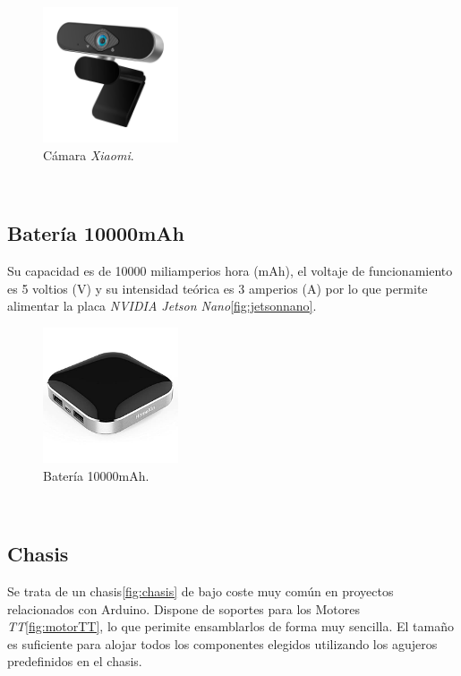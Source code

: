\begin{figure} [h!]
	\begin{center}
		\includegraphics[width=4cm]{figs/camera}
	\end{center}
	\caption{Cámara \textit{Xiaomi}.}
	\label{fig:xiaomicamera}
\end{figure}\

\subsection{Batería 10000mAh}
Su capacidad es de 10000 miliamperios hora (mAh), el voltaje de funcionamiento es 5 voltios (V) y su intensidad teórica es 3 amperios (A) por lo que permite alimentar la placa \textit{NVIDIA Jetson Nano}\ref{fig:jetsonnano}.\\

\begin{figure} [h!]
	\begin{center}
		\includegraphics[width=4cm]{figs/battery}
	\end{center}
	\caption{Batería 10000mAh.}
	\label{fig:battery}
\end{figure}\

\subsection{Chasis}
Se trata de un chasis\ref{fig:chasis} de bajo coste muy común en proyectos relacionados con Arduino. Dispone de soportes para los Motores \textit{TT}\ref{fig:motorTT}, lo que perimite ensamblarlos de forma muy sencilla. El tamaño es suficiente para alojar todos los componentes elegidos utilizando los agujeros predefinidos en el chasis.\\

